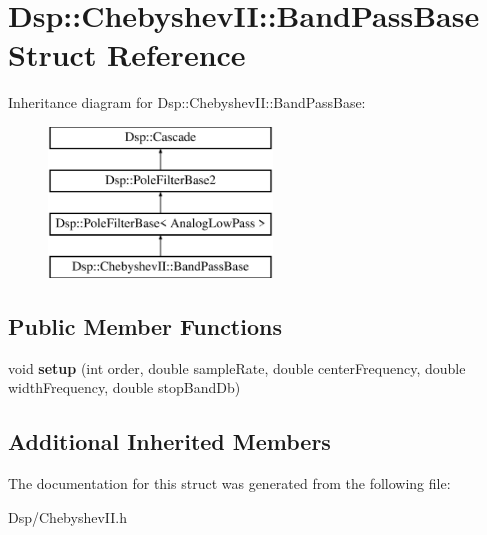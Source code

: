 \hypertarget{structDsp_1_1ChebyshevII_1_1BandPassBase}{\section{Dsp\-:\-:Chebyshev\-I\-I\-:\-:Band\-Pass\-Base Struct Reference}
\label{structDsp_1_1ChebyshevII_1_1BandPassBase}
}
Inheritance diagram for Dsp\-:\-:Chebyshev\-I\-I\-:\-:Band\-Pass\-Base\-:\begin{figure}[H]
\begin{center}
\leavevmode
\includegraphics[height=4.000000cm]{structDsp_1_1ChebyshevII_1_1BandPassBase}
\end{center}
\end{figure}
\subsection*{Public Member Functions}
\begin{DoxyCompactItemize}
\item 
\hypertarget{structDsp_1_1ChebyshevII_1_1BandPassBase_abd103efeea2d37d45deef9ad5fda7726}{void {\bfseries setup} (int order, double sample\-Rate, double center\-Frequency, double width\-Frequency, double stop\-Band\-Db)}\label{structDsp_1_1ChebyshevII_1_1BandPassBase_abd103efeea2d37d45deef9ad5fda7726}

\end{DoxyCompactItemize}
\subsection*{Additional Inherited Members}


The documentation for this struct was generated from the following file\-:\begin{DoxyCompactItemize}
\item 
Dsp/Chebyshev\-I\-I.\-h\end{DoxyCompactItemize}
